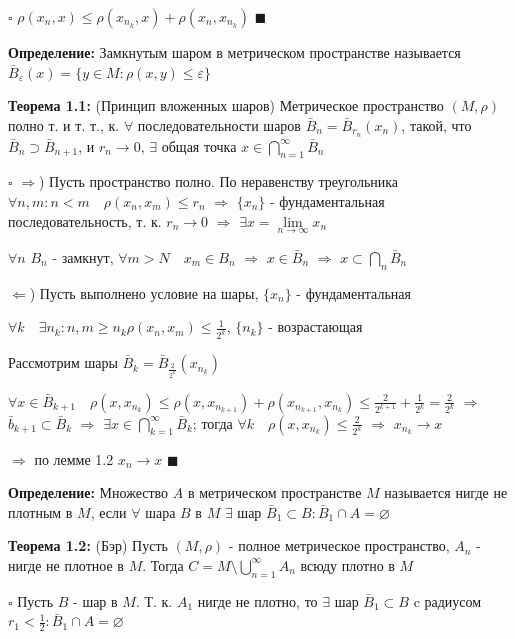 \documentclass[a4paper]{report}
\begin{document}
\noindent $\square$ $\rho(x_n,x)\le\rho(x_{n_k},x)+\rho(x_n,x_{n_k})$ $\blacksquare$
\bigskip

\noindent\textbf{Определение:} Замкнутым шаром в метрическом пространстве называется $\bar B_\varepsilon(x)=\{y\in M\colon
\rho(x,y)\le\varepsilon\}$
\bigskip

\noindent\textbf{Теорема 1.1:} (Принцип вложенных шаров) Метрическое пространство $(M,\rho)$ полно т. и т. т., к. $\forall$
последовательности шаров $\bar B_n=\bar B_{r_n}(x_n)$, такой, что $\bar B_n\supset\bar B_{n+1}$, и $r_n\to0$, $\exists$ 
общая точка $x\in\bigcap\limits_{n=1}^\infty\bar B_n$

\noindent $\square$ $\Rightarrow$) Пусть пространство полно. По неравенству треугольника $\forall n,m\colon n<m\quad
\rho(x_n,x_m)\le r_n$ $\Rightarrow$ $\{x_n\}$ - фундаментальная последовательность, т. к. $r_n\to0$ $\Rightarrow$ 
$\exists x=\lim\limits_{n\to\infty} x_n$

$\forall n$ $B_n$ - замкнут, $\forall m>N\quad x_m\in B_n$ $\Rightarrow$ $x\in\bar B_n$ $\Rightarrow$ $x\subset\bigcap\limits_n
\bar B_n$

$\Leftarrow$) Пусть выполнено условие на шары, $\{x_n\}$ - фундаментальная

$\forall k\quad\exists n_k\colon n,m\ge n_k\rho(x_n,x_m)\le\displaystyle\frac{1}{2^k}$, $\{n_k\}$ - возрастающая

Рассмотрим шары $\bar B_k=\bar B_{\displaystyle\frac{2}{2^k}}(x_{n_k})$

$\forall x\in\bar B_{k+1}\quad \rho(x,x_{n_k})\le\rho(x,x_{n_{k+1}})+\rho(x_{n_{k+1}},x_{n_k})\le\displaystyle\frac{2}{2^{k+1}}+\displaystyle\frac{1}{2^k}=
\displaystyle\frac{2}{2^k}$ $\Rightarrow$ $\bar b_{k+1}\subset\bar B_k$ $\Rightarrow$ $\exists x\in\bigcap\limits_{k=1}^\infty\bar B_k$; 
тогда $\forall k\quad\rho(x,x_{n_k})\le\displaystyle\frac{2}{2^k}$ $\Rightarrow$ $x_{n_k}\to x$ 

$\Rightarrow$ по лемме 1.2 $x_n\to x$ $\blacksquare$
\bigskip

\noindent\textbf{Определение:} Множество $A$ в метрическом пространстве $M$ называется нигде не плотным в $M$, если $\forall$
шара $B$ в $M$ $\exists$ шар $\bar B_1\subset B\colon\bar B_1\cap A=\varnothing$
\bigskip

\noindent\textbf{Теорема 1.2:} (Бэр) Пусть $(M,\rho)$ - полное метрическое пространство, $A_n$ - нигде не плотное в $M$. 
Тогда $C=M\setminus\bigcup\limits_{n=1}^\infty A_n$ всюду плотно в $M$

\noindent $\square$ Пусть $B$ - шар в $M$. Т. к. $A_1$ нигде не плотно, то $\exists$ шар $\bar B_1\subset B$ c радиусом 
$r_1<\frac12\colon\bar B_1\cap A=\varnothing$
\end{document}
